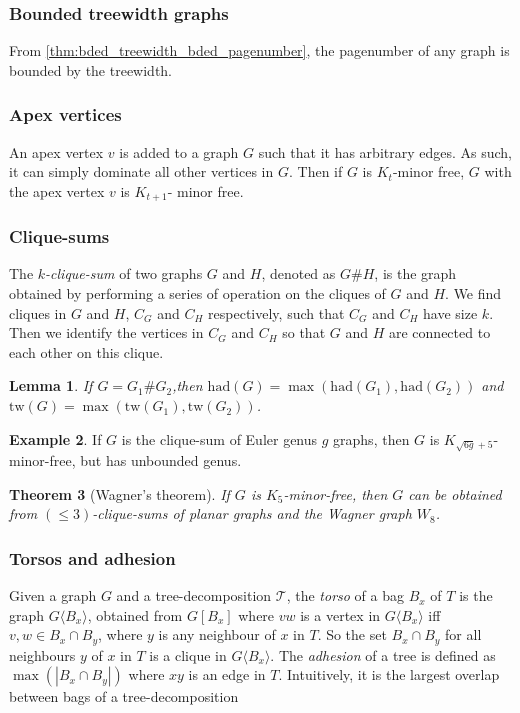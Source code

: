 \documentclass[]{report}
\newcommand{\tree}{\mathcal{T}}
\newcommand{\tw}{\text{tw}}
\newcommand{\had}{\text{had}}
\newtheorem{theorem}{Theorem}
\newtheorem{lemma}[theorem]{Lemma}
\theoremstyle{definition}
\newtheorem{example}[theorem]{Example}
\numberwithin{theorem}{section}
\numberwithin{equation}{section}
\begin{document}
\subsubsection{Bounded treewidth graphs}\label{sssec:Bded_Tw_graph}
From \cref{thm:bded_treewidth_bded_pagenumber}, the pagenumber of any graph is bounded by the treewidth.

\subsubsection{Apex vertices}\label{sssec:Apex_Vertices}
An apex vertex $v$ is added to a graph $G$ such that it has arbitrary edges. As such, it can simply dominate all other vertices in $G$. Then if $G$ is $K_t$-minor free, $G$ with the apex vertex $v$ is $K_{t+1}$- minor free. 
\subsubsection{Clique-sums}\label{sssec:Clique_Sums}
The \textit{$k$-clique-sum} of two graphs $G$ and $H$, denoted as $G \# H$, is the graph obtained by performing a series of operation on the cliques of $G$ and $H$. We find cliques in $G$ and $H$, $C_G$ and $C_H$ respectively, such that $C_G$ and $C_H$ have size $k$. Then we identify the vertices in $C_G$ and $C_H$ so that $G$ and $H$ are connected to each other on this clique. 

\begin{lemma}
	If $G = G_1 \# G_2$,then $\had(G) = \max(\had(G_1), \had(G_2))$ and $\tw(G) = \max(\tw(G_1), \tw(G_2))$.
\end{lemma}

\begin{example}\label{ex:clique_sum_genus}
	If $G$ is the clique-sum of Euler genus $g$ graphs, then $G$ is $K_{\sqrt{6g} + 5}$-minor-free, but has unbounded genus.
\end{example}

\begin{theorem}[Wagner's theorem\cite{wagnerUeberEigenschaftEbenen1937}]\label{thm:WagnersTheorem}
	If $G$ is $K_5$-minor-free, then $G$ can be obtained from $(\leq 3)$-clique-sums of planar graphs and the Wagner graph $W_8$.
\end{theorem}


\subsubsection{Torsos and adhesion}\label{sssec:Torsos and Adhesion}
Given a graph $G$ and a tree-decomposition $\tree$, the \textit{torso} of a bag $B_x$ of $T$ is the graph $G\langle B_x \rangle$, obtained from $G[B_x]$ where $vw$ is a vertex in $G\langle B_x \rangle$ iff $v,w \in B_x \cap B_y$, where $y$ is any neighbour of $x$ in $T$. So the set $B_x \cap B_y$ for all neighbours $y$ of $x$ in $T$ is a clique in $G\langle B_x \rangle$. 
The \textit{adhesion} of a tree is defined as $\max(|B_x \cap B_y|)$ where $xy$ is an edge in $T$. Intuitively, it is the largest overlap between bags of a tree-decomposition
\end{document}
